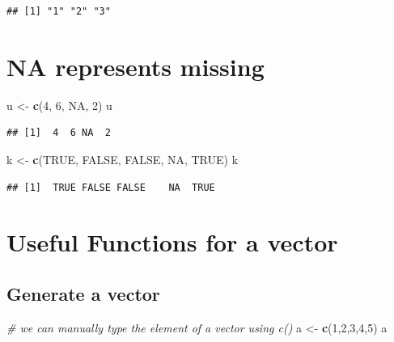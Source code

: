 \documentclass[]{book}
\newenvironment{Shaded}{\begin{snugshade}}{\end{snugshade}}
\newcommand{\KeywordTok}[1]{\textcolor[rgb]{0.13,0.29,0.53}{\textbf{{#1}}}}
\newcommand{\DecValTok}[1]{\textcolor[rgb]{0.00,0.00,0.81}{{#1}}}
\newcommand{\StringTok}[1]{\textcolor[rgb]{0.31,0.60,0.02}{{#1}}}
\newcommand{\CommentTok}[1]{\textcolor[rgb]{0.56,0.35,0.01}{\textit{{#1}}}}
\newcommand{\OtherTok}[1]{\textcolor[rgb]{0.56,0.35,0.01}{{#1}}}
\newcommand{\NormalTok}[1]{{#1}}
\begin{document}
\begin{verbatim}
## [1] "1" "2" "3"
\end{verbatim}

\section{NA represents missing}\label{na-represents-missing}

\begin{Shaded}
\begin{Highlighting}[]
\NormalTok{u <-}\StringTok{ }\KeywordTok{c}\NormalTok{(}\DecValTok{4}\NormalTok{, }\DecValTok{6}\NormalTok{, }\OtherTok{NA}\NormalTok{, }\DecValTok{2}\NormalTok{)}
\NormalTok{u}
\end{Highlighting}
\end{Shaded}

\begin{verbatim}
## [1]  4  6 NA  2
\end{verbatim}

\begin{Shaded}
\begin{Highlighting}[]
\NormalTok{k <-}\StringTok{ }\KeywordTok{c}\NormalTok{(}\OtherTok{TRUE}\NormalTok{, }\OtherTok{FALSE}\NormalTok{, }\OtherTok{FALSE}\NormalTok{, }\OtherTok{NA}\NormalTok{, }\OtherTok{TRUE}\NormalTok{)}
\NormalTok{k}
\end{Highlighting}
\end{Shaded}

\begin{verbatim}
## [1]  TRUE FALSE FALSE    NA  TRUE
\end{verbatim}

\section{Useful Functions for a
vector}\label{useful-functions-for-a-vector}

\subsection{Generate a vector}\label{generate-a-vector}

\begin{Shaded}
\begin{Highlighting}[]
\CommentTok{# we can manually type the element of a vector using c()}
\NormalTok{a <-}\StringTok{ }\KeywordTok{c}\NormalTok{(}\DecValTok{1}\NormalTok{,}\DecValTok{2}\NormalTok{,}\DecValTok{3}\NormalTok{,}\DecValTok{4}\NormalTok{,}\DecValTok{5}\NormalTok{)}
\NormalTok{a}
\end{Highlighting}
\end{Shaded}
\end{document}
